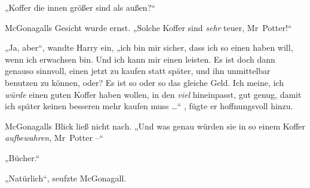 „Koffer die innen größer sind als außen?“

McGonagalls Gesicht wurde ernst.
„Solche Koffer sind \emph{sehr} teuer, Mr~Potter!“

„Ja, aber“, wandte Harry ein, „ich bin mir sicher, dass ich so einen haben will, wenn ich erwachsen bin. Und ich kann mir einen leisten. Es ist doch dann genauso sinnvoll, einen jetzt zu kaufen statt später, und ihn unmittelbar benutzen zu können, oder? Es ist so oder so das gleiche Geld. Ich meine, ich \emph{würde} einen guten Koffer haben wollen, in den \emph{viel} hineinpasst, gut genug, damit ich später keinen besseren mehr kaufen muss …“ , fügte er hoffnungsvoll hinzu.

McGonagalls Blick ließ nicht nach.
„Und was genau würden sie in so einem Koffer \emph{aufbewahren}, Mr~Potter –“

„Bücher.“

„Natürlich“, seufzte McGonagall.

